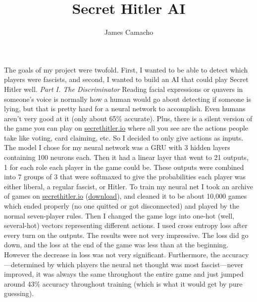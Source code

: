 \documentclass[]{article}
\title{Secret Hitler AI}
\author{James Camacho}
\begin{document}
\maketitle

The goals of my project were twofold. First, I wanted to be able to detect which players were fascists, and second, I wanted to build an AI that could play Secret Hitler well.
\vspace{0.25cm}\newline
\emph{Part I. The Discriminator}
\newline\indent
Reading facial expressions or quavers in someone's voice is normally how a human would go about detecting if someone is lying, but that is pretty hard for a neural network to accomplish. Even humans aren't very good at it (only about 65\% accurate). Plus, there is a silent version of the game you can play on \href{secrethitler.io}{secrethitler.io} where all you see are the actions people take like voting, card claiming, etc. So I decided to only give actions as inputs.
\newline\indent
The model I chose for my neural network was a GRU with 3 hidden layers containing 100 neurons each. Then it had a linear layer that went to 21 outputs, 1 for each role each player in the game could be. These outputs were combined into 7 groups of 3 that were softmaxed to give the probabilities each player was either liberal, a regular fascist, or Hitler.
\newline\indent
To train my neural net I took an archive of games on \href{secrethitler.io}{secrethitler.io} (\href{http://secrethitler.io/public/gameDumps/gameSummaries.tar.gz}{download}), and cleaned it to be about 10,000 games which ended properly (no one quitted or got disconnected) and played by the normal seven-player rules. Then I changed the game logs into one-hot (well, several-hot) vectors representing different actions. I used cross entropy loss after every turn on the outputs.
\newline\indent
The results were not very impressive. The loss did go down, and the loss at the end of the game was less than at the beginning.
However the decrease in loss was not very significant. Furthermore, the accuracy—determined by which players the neural net thought was most fascist—never improved, it was always the same throughout the entire game and just jumped around 43\% accuracy throughout training (which is what it would get by pure guessing).
\end{document}

